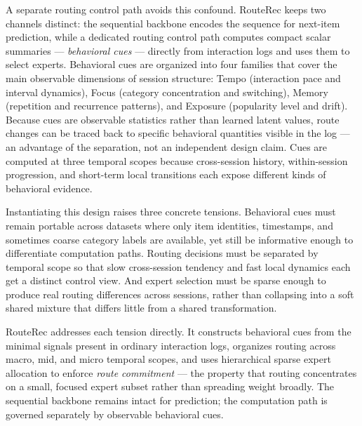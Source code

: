 \documentclass[sigconf,review,anonymous]{acmart}
\begin{document}
A separate routing control path avoids this confound. RouteRec keeps two channels distinct: the sequential backbone encodes the sequence for next-item prediction, while a dedicated routing control path computes compact scalar summaries — \emph{behavioral cues} — directly from interaction logs and uses them to select experts. Behavioral cues are organized into four families that cover the main observable dimensions of session structure: Tempo (interaction pace and interval dynamics), Focus (category concentration and switching), Memory (repetition and recurrence patterns), and Exposure (popularity level and drift). Because cues are observable statistics rather than learned latent values, route changes can be traced back to specific behavioral quantities visible in the log — an advantage of the separation, not an independent design claim. Cues are computed at three temporal scopes because cross-session history, within-session progression, and short-term local transitions each expose different kinds of behavioral evidence.

Instantiating this design raises three concrete tensions. Behavioral cues must remain portable across datasets where only item identities, timestamps, and sometimes coarse category labels are available, yet still be informative enough to differentiate computation paths. Routing decisions must be separated by temporal scope so that slow cross-session tendency and fast local dynamics each get a distinct control view. And expert selection must be sparse enough to produce real routing differences across sessions, rather than collapsing into a soft shared mixture that differs little from a shared transformation.

RouteRec addresses each tension directly. It constructs behavioral cues from the minimal signals present in ordinary interaction logs, organizes routing across macro, mid, and micro temporal scopes, and uses hierarchical sparse expert allocation to enforce \emph{route commitment} — the property that routing concentrates on a small, focused expert subset rather than spreading weight broadly. The sequential backbone remains intact for prediction; the computation path is governed separately by observable behavioral cues.
\end{document}

